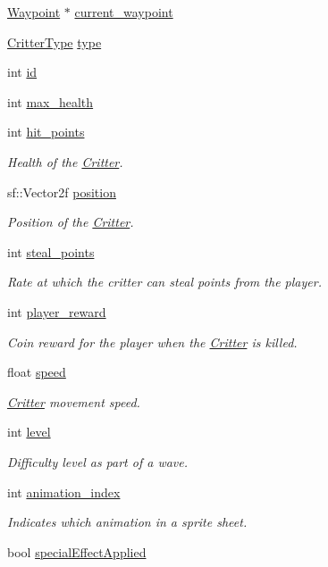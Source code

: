 \begin{DoxyCompactItemize}
\item 
\hyperlink{class_waypoint}{Waypoint} $\ast$ \hyperlink{class_critter_a2b72710f8e9418a37d811240f1f7aa18}{current\+\_\+waypoint}
\item 
\hyperlink{class_critter_acda8a5c3234b66101e0546d75d6f90f1}{Critter\+Type} \hyperlink{class_critter_ac59fc8262aaffbdae6f2823460b58737}{type}
\item 
int \hyperlink{class_critter_ae775e0ebe6e8bbe249c403670bda46f8}{id}
\item 
int \hyperlink{class_critter_a9b2e317fb3a104ea9b449f77c81d7d7a}{max\+\_\+health}
\item 
int \hyperlink{class_critter_a916038a11e8443ea403a644e91fc791e}{hit\+\_\+points}
\begin{DoxyCompactList}\small\item\em Health of the \hyperlink{class_critter}{Critter}. \end{DoxyCompactList}\item 
sf\+::\+Vector2f \hyperlink{class_critter_a7973c2224ad88f4ef758440c306ee31c}{position}
\begin{DoxyCompactList}\small\item\em Position of the \hyperlink{class_critter}{Critter}. \end{DoxyCompactList}\item 
int \hyperlink{class_critter_ad2b5b3ee8a0b69d4023f60cfb9f26a6a}{steal\+\_\+points}
\begin{DoxyCompactList}\small\item\em Rate at which the critter can steal points from the player. \end{DoxyCompactList}\item 
int \hyperlink{class_critter_a2a17f7366fbde83714742e66ba3e63a7}{player\+\_\+reward}
\begin{DoxyCompactList}\small\item\em Coin reward for the player when the \hyperlink{class_critter}{Critter} is killed. \end{DoxyCompactList}\item 
float \hyperlink{class_critter_adde7d84a0dd9ac8f5dc144464928638f}{speed}
\begin{DoxyCompactList}\small\item\em \hyperlink{class_critter}{Critter} movement speed. \end{DoxyCompactList}\item 
int \hyperlink{class_critter_a9f9a6408a55212036f317710dc3da410}{level}
\begin{DoxyCompactList}\small\item\em Difficulty level as part of a wave. \end{DoxyCompactList}\item 
int \hyperlink{class_critter_a00b1ddafe5beeed3dac75f81568bb404}{animation\+\_\+index}
\begin{DoxyCompactList}\small\item\em Indicates which animation in a sprite sheet. \end{DoxyCompactList}\item 
bool \hyperlink{class_critter_aa30e57414bd64c920dca286f87da5c3f}{special\+Effect\+Applied}
\end{DoxyCompactItemize}
